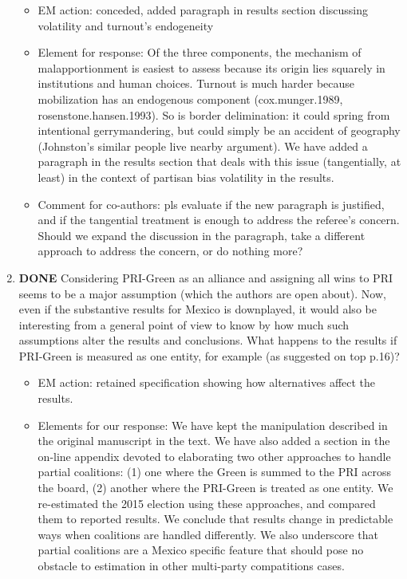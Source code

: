 \documentclass{article}
\begin{document}
\begin{enumerate}
\label{sec:orgheadline10}
\begin{itemize}
\item EM action: conceded, added paragraph in results section discussing volatility and turnout's endogeneity
\item Element for response: Of the three components, the mechanism of malapportionment is easiest to assess because its origin lies squarely in institutions and human choices. Turnout is much harder because mobilization has an endogenous component (cox.munger.1989, rosenstone.hansen.1993). So is border delimination: it could spring from intentional gerrymandering, but could simply be an accident of geography (Johnston's similar people live nearby argument). We have added a paragraph in the results section that deals with this issue (tangentially, at least) in the context of partisan bias volatility in the results.
\item Comment for co-authors: pls evaluate if the new paragraph is justified, and if the tangential treatment is enough to address the referee's concern. Should we expand the discussion in the paragraph, take a different approach to address the concern, or do nothing more?
\end{itemize}
\item {\bfseries\sffamily DONE} Considering PRI-Green as an alliance and assigning all wins to PRI seems to be a major assumption (which the authors are open about). Now, even if the substantive results for Mexico is downplayed, it would also be interesting from a general point of view to know by how much such assumptions alter the results and conclusions. What happens to the results if PRI-Green is measured as one entity, for example (as suggested on top p.16)?
\label{sec:orgheadline11}
\begin{itemize}
\item EM action: retained specification showing how alternatives affect the results.
\item Elements for our response: We have kept the manipulation described in the original manuscript in the text. We have also added a section in the on-line appendix devoted to elaborating two other approaches to handle partial coalitions: (1) one where the Green is summed to the PRI across the board, (2) another where the PRI-Green is treated as one entity. We re-estimated the 2015 election using these approaches, and compared them to reported results. We conclude that results change in predictable ways when coalitions are handled differently. We also underscore that partial coalitions are a Mexico specific feature that should pose no obstacle to estimation in other multi-party compatitions cases.

\end{itemize}
\end{enumerate}
\end{document}
